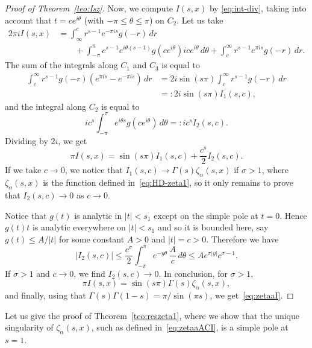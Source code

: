 \documentclass[a4paper]{amsart}
\theoremstyle{plain}
\theoremstyle{definition}
\theoremstyle{remark}
\numberwithin{equation}{section}
\begin{document}
\begin{proof}[Proof of Theorem~\ref{teo:Isz}]
Now, we compute $I(s,x)$ by \eqref{eq:int-div}, taking into account that $t=ce^{i\theta}$ (with $-\pi \leq \theta \leq \pi$) on $C_2$. Let us take
\begin{align*}
    2\pi i I(s,x) & = \int_{\infty}^{c}r^{s-1}e^{-\pi i s}g(-r)\,dr \\
    &\qquad + \int_{-\pi}^{\pi} c^{s-1} e^{i\theta(s-1)} g(ce^{i\theta})i c e^{i\theta}\,d\theta 
    + \int_{c}^{\infty}r^{s-1}e^{\pi i s}g(-r)\,dr.
\end{align*}
The sum of the integrals along $C_1$ and $C_3$ is equal to
\begin{align*}
   \int_{c}^{\infty} r^{s-1} g(-r) ( e^{\pi i s} - e^{-\pi i s})\,dr 
   & = 2i \sin(s\pi) \int_{c}^{\infty}r^{s-1}g(-r)\,dr \\ 
   & =: 2i \sin(s\pi) I_1(s,c),
\end{align*}
and the integral along $C_2$ is equal to
\[
ic^s\int_{-\pi}^{\pi}e^{i\theta s}g(c e^{i\theta})\,d\theta =: i c^s I_2(s,c).
\]
Dividing by $2i$, we get
\[
\pi I(s,x) = \sin(s\pi) I_1(s,c) + \frac{c^s}{2} I_2(s,c).
\]
If we take $c\to 0$, we notice that $I_1(s,c) \to \Gamma(s)\zeta_{\alpha}(s,x)$ if $\sigma > 1$, where $\zeta_{\alpha}(s,x)$ is the function defined in~\eqref{eq:HD-zeta1}, so it only remains to prove that $I_2(s,c) \to 0$ as $c \to 0$. 

Notice that $g(t)$ is analytic in $|t|<s_1$ except on the simple pole at $t=0$. Hence $g(t)t$ is analytic everywhere on $|t|<s_1$ and so it is bounded here, say $g(t) \leq A/|t|$ for some constant $A > 0$ and $|t|=c>0$. Therefore we have
\[
|I_2(s,c)| \leq \frac{c^{\sigma}}{2} \int_{-\pi}^{\pi} e^{-y\theta} \,\frac{A}{c}\,d\theta 
\leq Ae^{\pi |y|}c^{\sigma-1}.
\]
If $\sigma > 1$ and $c\to 0$, we find $I_2(s,c) \to 0$. In conclusion, for $\sigma > 1$,
\[
\pi I(s,x) = \sin(s\pi) \Gamma(s) \zeta_{\alpha}(s,x),
\]
and finally, using that $\Gamma(s)\Gamma(1-s) = \pi/\sin(\pi s)$, we get~\eqref{eq:zetaaI}.
\end{proof}

Let us give the proof of Theorem~\ref{teo:reszeta1}, where we show that the unique singularity of $\zeta_{\alpha}(s,x)$, such as defined in~\eqref{eq:zetaaACI}, is a simple pole at $s=1$. 
\end{document}

